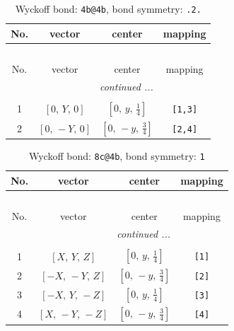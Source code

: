 \documentclass[fleqn,8pt]{jsarticle}
\begin{document}
\renewcommand{\arraystretch}{1.2}
\begin{longtable}{cccc}
\caption{Wyckoff bond: {\tt 4b@4b}, bond symmetry: {\tt .2.}}
 \\
 \hline \hline
No. & vector & center & mapping \\ \hline \endfirsthead

\multicolumn{3}{l}{\tablename\ \thetable{}} \\
 \hline \hline
No. & vector & center & mapping \\ \hline \endhead

 \hline \hline
\multicolumn{3}{r}{\footnotesize\it continued ...} \\ \endfoot

 \hline \hline
\multicolumn{3}{r}{} \\ \endlastfoot

1 & $\left[ 0,\, Y,\, 0 \right]$ & $\left[ 0,\, y,\, \frac{1}{4} \right]$ & {\tt [1,3]} \\ \hline
2 & $\left[ 0,\, - Y,\, 0 \right]$ & $\left[ 0,\, - y,\, \frac{3}{4} \right]$ & {\tt [2,4]} \\
\end{longtable}
\renewcommand{\arraystretch}{1.2}
\begin{longtable}{cccc}
\caption{Wyckoff bond: {\tt 8c@4b}, bond symmetry: {\tt 1}}
 \\
 \hline \hline
No. & vector & center & mapping \\ \hline \endfirsthead

\multicolumn{3}{l}{\tablename\ \thetable{}} \\
 \hline \hline
No. & vector & center & mapping \\ \hline \endhead

 \hline \hline
\multicolumn{3}{r}{\footnotesize\it continued ...} \\ \endfoot

 \hline \hline
\multicolumn{3}{r}{} \\ \endlastfoot

1 & $\left[ X,\, Y,\, Z \right]$ & $\left[ 0,\, y,\, \frac{1}{4} \right]$ & {\tt [1]} \\ \hline
2 & $\left[ - X,\, - Y,\, Z \right]$ & $\left[ 0,\, - y,\, \frac{3}{4} \right]$ & {\tt [2]} \\ \hline
3 & $\left[ - X,\, Y,\, - Z \right]$ & $\left[ 0,\, y,\, \frac{1}{4} \right]$ & {\tt [3]} \\ \hline
4 & $\left[ X,\, - Y,\, - Z \right]$ & $\left[ 0,\, - y,\, \frac{3}{4} \right]$ & {\tt [4]} \\
\end{longtable}
\end{document}
